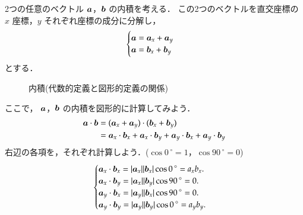                 2つの任意のベクトル $\boldsymbol{a}$，$\boldsymbol{b}$ の内積を考える．
                この2つのベクトルを直交座標の $x$ 座標，$y$ それぞれ座標の成分に分解し，
                    \begin{align*}
                        \begin{cases}
                        \displaystyle \boldsymbol{a} = \boldsymbol{a}_{x}  +  \boldsymbol{a}_{y} \\
                        \displaystyle \boldsymbol{a} = \boldsymbol{b}_{x}  +  \boldsymbol{b}_{y}
                        \end{cases}
                    \end{align*}
                とする．
                    \begin{figure}[hbt]
                        \begin{center}
                            \caption{内積(代数的定義と図形的定義の関係)}
                            \label{fig:naiseki_zahyou_zukei}
                        \end{center}
                    \end{figure}
                ここで， $\boldsymbol{a}$，$\boldsymbol{b}$ の内積を図形的に計算してみよう．
                    \begin{align*}
                        \boldsymbol{a}\cdot\boldsymbol{b} &= ( \boldsymbol{a}_{x}  +  \boldsymbol{a}_{y} ) \cdot  ( \boldsymbol{b}_{x}  +  \boldsymbol{b}_{y} ) \\
                                        &= \boldsymbol{a}_{x}\cdot\boldsymbol{b}_{x} + \boldsymbol{a}_{x}\cdot\boldsymbol{b}_{y} +\boldsymbol{a}_{y}\cdot\boldsymbol{b}_{x} + \boldsymbol{a}_{y}\cdot\boldsymbol{b}_{y}
                    \end{align*}
                右辺の各項を，それぞれ計算しよう．($\cos {0\,}^{\circ}=1$，$\cos {90\,}^{\circ}=0$)
                    \begin{align*}
                        \begin{cases}
                        \displaystyle \boldsymbol{a}_{x}\cdot\boldsymbol{b}_{x} = |\boldsymbol{a}_{x}| |\boldsymbol{b}_{x}| \cos {0\,}^{\circ} = a_{x}b_{x}. \\
                        \displaystyle \boldsymbol{a}_{x}\cdot\boldsymbol{b}_{y} = |\boldsymbol{a}_{x}| |\boldsymbol{b}_{y}| \cos {90\,}^{\circ} = 0.\\
                        \displaystyle \boldsymbol{a}_{y}\cdot\boldsymbol{b}_{x} = |\boldsymbol{a}_{y}| |\boldsymbol{b}_{x}| \cos {90\,}^{\circ} = 0.\\
                        \displaystyle \boldsymbol{a}_{y}\cdot\boldsymbol{b}_{y} = |\boldsymbol{a}_{y}| |\boldsymbol{b}_{y}| \cos {0\,}^{\circ} = a_{y}b_{y}.\\
                        \end{cases}
                    \end{align*}
